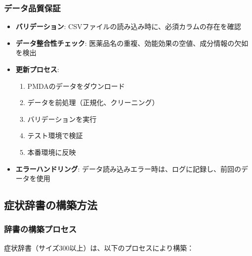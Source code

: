 \documentclass[a4paper,11pt,ja=standard,xelatex]{bxjsarticle}
\theoremstyle{definition}
\begin{document}
\subsubsection{データ品質保証}

\begin{itemize}
\item \textbf{バリデーション}: CSVファイルの読み込み時に、必須カラムの存在を確認
\item \textbf{データ整合性チェック}: 医薬品名の重複、効能効果の空値、成分情報の欠如を検出
\item \textbf{更新プロセス}: 
  \begin{enumerate}
  \item PMDAのデータをダウンロード
  \item データを前処理（正規化、クリーニング）
  \item バリデーションを実行
  \item テスト環境で検証
  \item 本番環境に反映
  \end{enumerate}
\item \textbf{エラーハンドリング}: データ読み込みエラー時は、ログに記録し、前回のデータを使用
\end{itemize}

\subsection{症状辞書の構築方法}

\subsubsection{辞書の構築プロセス}

症状辞書（サイズ300以上）は、以下のプロセスにより構築：
\end{document}
